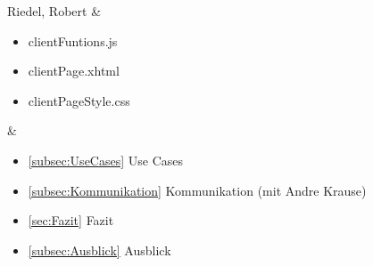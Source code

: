 \begin{table}[H]
\begin{tabu}
		Riedel, Robert & \begin{itemize}
		\itemsep 0pt
		\item clientFuntions.js
		\item clientPage.xhtml
		\item clientPageStyle.css
\end{itemize} & \begin{itemize}
		\itemsep 0pt
		\item \ref{subsec:UseCases} Use Cases
		\item \ref{subsec:Kommunikation} Kommunikation (mit Andre Krause)
		\item \ref{sec:Fazit} Fazit
		\item \ref{subsec:Ausblick} Ausblick
\end{itemize}\\
	\end{tabu}
\end{table}